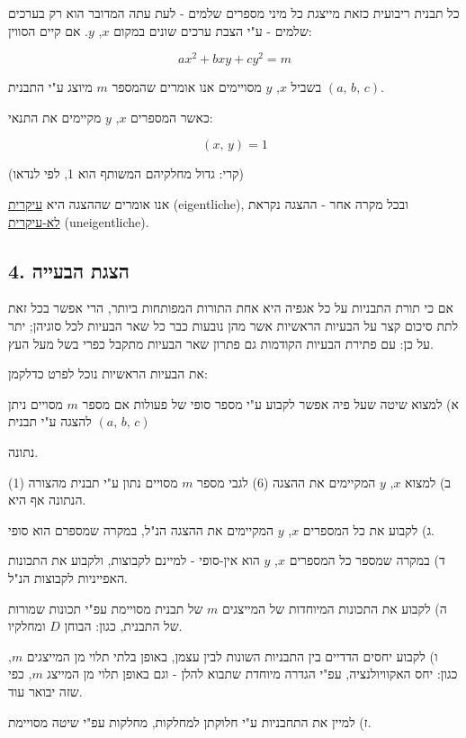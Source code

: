 כל תבנית ריבועית כזאת מייצגת כל מיני מספרים שלמים - לעת עתה המדובר הוא רק בערכים שלמים - ע"י הצבת ערכים שונים במקום $x$, $y$. אם קיים הסווין:

\[ ax^2 + bxy + cy^2 = m \tag{6} \]

בשביל $x$, $y$ מסויימים אנו אומרים שהמספר $m$ מיוצג ע"י התבנית $(a,\,b,\,c)$.

\medskip
כאשר המספרים $x$, $y$ מקיימים את התנאי:

\[ (x,\, y) = 1 \tag{7} \]

(קרי: גדול מחלקיהם המשותף הוא 1, לפי לנדאו)

\medskip
אנו אומרים שההצגה היא \underline{עיקרית} (eigentliche), ובכל מקרה אחר - ההצגה נקראת \underline{לא-עיקרית} (uneigentliche).

\subsection*{4. הצגת הבעייה}

אם כי תורת התבניות על כל אגפיה היא אחת התורות המפותחות ביותר, הרי אפשר בכל זאת לתת סיכום קצר על הבעיות הראשיות אשר מהן נובעות כבר כל שאר הבעיות לכל סוגיהן; יתר על כן: עם פתירת הבעיות הקודמות גם פתרון שאר הבעיות מתקבל כפרי בשל מעל העץ.

\medskip
את הבעיות הראשיות נוכל לפרט כדלקמן:

\medskip
\noindent א) למצוא שיטה שעל פיה אפשר לקבוע ע"י מספר סופי של פעולות אם מספר $m$ מסויים ניתן להצגה ע"י תבנית $(a,\,b,\,c)$

\noindent נתונה.

\medskip
\noindent ב) למצוא $x$, $y$ המקיימים את ההצגה (6) לגבי מספר $m$ מסויים נתון ע"י תבנית מהצורה (1) הנתונה אף היא.

\medskip
\noindent ג) לקבוע את כל המספרים $x$, $y$ המקיימים את ההצגה הנ"ל, במקרה שמספרם הוא סופי.

\medskip
\noindent ד) במקרה שמספר כל המספרים $x$, $y$ הוא אין-סופי - למיינם לקבוצות, ולקבוע את התכונות האפייניות לקבוצות הנ"ל.

\medskip
\noindent ה) לקבוע את התכונות המיוחדות של המייצגים $m$ של תבנית מסויימת עפ"י תכונות שמורות של התבנית, כגון: הבוחן $D$ ומחלקיו.

\medskip
\noindent ו) לקבוע יחסים הדדיים בין התבניות השונות לבין עצמן, באופן בלתי תלוי מן המייצגים $m$, כגון: יחס האקוויולנציה, עפ"י הגדרה מיוחדת שתבוא להלן - וגם באופן תלוי מן המייצג $m$, כפי שזה יבואר עוד.

\medskip
\noindent ז) למיין את התחבניות ע"י חלוקתן למחלקות, מחלקות עפ"י שיטה מסויימת.

